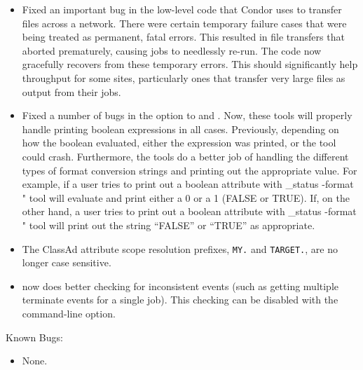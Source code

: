 \begin{itemize}

\item Fixed an important bug in the low-level code that Condor uses to
  transfer files across a network.
  There were certain temporary failure cases that were being treated
  as permanent, fatal errors.
  This resulted in file transfers that aborted prematurely, causing
  jobs to needlessly re-run.
  The code now gracefully recovers from these temporary errors.
  This should significantly help throughput for some sites,
  particularly ones that transfer very large files as output from
  their jobs.

\item Fixed a number of bugs in the  option to 
  and .
  Now, these tools will properly handle printing boolean expressions
  in all cases.
  Previously, depending on how the boolean evaluated, either the
  expression was printed, or the tool could crash.
  Furthermore, the tools do a better job of handling the different 
  types of format conversion strings and printing out the appropriate
  value.
  For example, if a user tries to print out a boolean attribute with
  \verb@condor_status -format "%d\n" HasFileTransfer@, the
   tool will evaluate  and print
  either a 0 or a 1 (FALSE or TRUE).
  If, on the other hand, a user tries to print out a boolean attribute
  with \verb@condor_status -format "%s\n" HasFileTransfer@, the
   tool will print out the string ``FALSE'' or ``TRUE''
  as appropriate.

\item The ClassAd attribute scope resolution prefixes, \texttt{MY.}
  and \texttt{TARGET.}, are no longer case sensitive.

\item {} now does better checking for inconsistent events
(such as getting multiple terminate events for a single job).  This
checking can be disabled with the  command-line
option.

\end{itemize}

\noindent Known Bugs:

\begin{itemize}

\item None.

\end{itemize}




